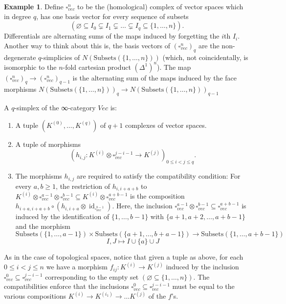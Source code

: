 \documentclass[a4paper]{amsart}
\numberwithin{figure}{section}
\theoremstyle{theorem}
\theoremstyle{definition}
\newtheorem{exam}[thm]{Example}
\newcommand{\grVec}{{Vec}}
\DeclareMathOperator{\id}{id}
\begin{document}
\begin{exam} \label{exam:vec}
Define $\square^n_{vec}$ to be the (homological) complex of vector spaces which in degree $q$, has one basis vector for every sequence of subsets 
\[ (\varnothing \subseteq I_0 \subsetneq I_1 \subsetneq \dots \subsetneq I_q \subseteq \{1, \dots, n\}). \]
Differentials are alternating sums of the maps induced by forgetting the $i$th $I_i$. Another way to think about this is, the basis vectors of $(\square^n_{vec})_q$ are the non-degenerate $q$-simplicies of $N(\textrm{Subsets}(\{1, \dots, n\}))$ (which, not coincidentally, is isomorphic to the $n$-fold cartesian product $(\Delta^1)^n$). The map $(\square^n_{vec})_q \to (\square^n_{vec})_{q-1}$ is the alternating sum of the maps induced by the face morphisms $N(\textrm{Subsets}(\{1, \dots, n\}))_q \to N(\textrm{Subsets}(\{1, \dots, n\}))_{q-1}$

A $q$-simplex of the ∞-category $\grVec$ is:
\begin{enumerate}
 \item A tuple $(K^{(0)}, \dots, K^{(q)})$ of $q{+}1$ complexes of vector spaces.

 \item A tuple of morphisms
 \[ (h_{i,j}: K^{(i)} {\otimes} \square^{j{-}i{-}1}_{vec} \to K^{(j)})_{0 \leq i < j \leq q}. \]%

 \item The morphisms $h_{i,j}$ are required to satisfy the compatibility condition: For every $a, b \geq 1$, the restriction of $h_{i,i{+}a{+}b}$ to $K^{(i)}{\otimes}\square^{a{-}1}_{vec} {\otimes} \square^{b{-}1}_{vec} \subseteq K^{(i)}{\otimes}\square^{a{+}b{-}1}_{vec}$ is the composition $h_{i{+}a,i{+}a{+}b} \circ (h_{i,i{+}a} \otimes \id_{\square^{b{-}1}_{vec}})$. Here, the inclusion $\square^{a{-}1}_{vec} {\otimes} \square^{b{-}1}_{vec} \subseteq \square^{a{+}b{-}1}_{vec}$ is induced by the identification of $\{1, \dots, b{-}1\}$ with $\{a{+}1, a{+}2, \dots, a{+}b{-}1\}$ and the morphism
\[ 
 \textrm{Subsets}(\{1, \dots, a{-}1\}) \times  \textrm{Subsets}(\{a{+}1, \dots, b{+}a{-}1\}) \to \textrm{Subsets}(\{1, \dots, a{+}b{-}1\}) 
 \]
 \[
 I, J \mapsto I \cup \{a\} \cup J 
\]
 \end{enumerate}

As in the case of topological spaces, notice that given a tuple as above, for each $0 \leq i < j  \leq n$ we have a morphism $f_{ij}: K^{(i)} \to K^{(j)}$ induced by the inclusion $\square_{vec}^0 \subseteq \square^{j{-}i{-}1}_{vec}$ corresponding to the empty set $(\varnothing \subseteq \{1, \dots, n\})$. The compatibilities enforce that the inclusions $\square_{vec}^0 \subseteq \square^{j{-}i{-}1}_{vec}$ must be equal to the various compositions $K^{(i)} \to K^{(i_1)} \to \dots K^{(j)}$ of the $f$'s.


\end{exam}
\end{document}
